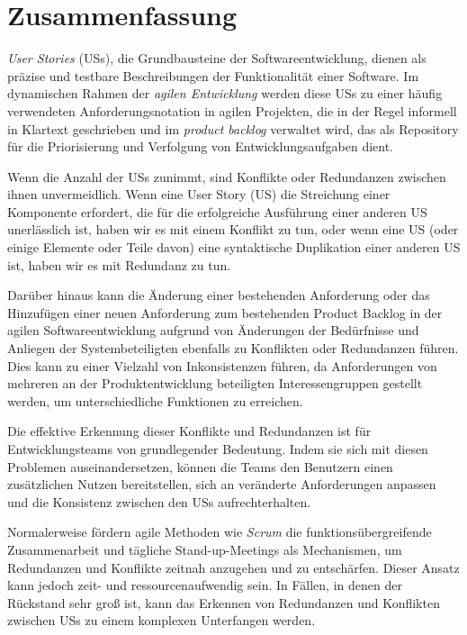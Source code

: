 \section*{Zusammenfassung}
\emph{User Stories} (USs), die Grundbausteine der Softwareentwicklung, dienen als präzise und testbare Beschreibungen der Funktionalität einer Software. Im dynamischen Rahmen der \emph{agilen Entwicklung} werden diese USs zu einer häufig verwendeten Anforderungsnotation in agilen Projekten\cite{wang2014role}, die in der Regel informell in Klartext geschrieben und im \textit{product backlog} verwaltet wird, das als Repository für die Priorisierung und Verfolgung von Entwicklungsaufgaben dient.

Wenn die Anzahl der USs zunimmt, sind Konflikte oder Redundanzen zwischen ihnen unvermeidlich. Wenn eine User Story (US) die Streichung einer Komponente erfordert, die für die erfolgreiche Ausführung einer anderen US unerlässlich ist, haben wir es mit einem Konflikt zu tun, oder wenn eine US (oder einige Elemente oder Teile davon) eine syntaktische Duplikation einer anderen US ist, haben wir es mit Redundanz zu tun.

Darüber hinaus kann die Änderung einer bestehenden Anforderung oder das Hinzufügen einer neuen Anforderung zum bestehenden Product Backlog in der agilen Softwareentwicklung aufgrund von Änderungen der Bedürfnisse und Anliegen der Systembeteiligten ebenfalls zu Konflikten oder Redundanzen führen. Dies kann zu einer Vielzahl von Inkonsistenzen führen, da Anforderungen von mehreren an der Produktentwicklung beteiligten Interessengruppen gestellt werden, um unterschiedliche Funktionen zu erreichen.

Die effektive Erkennung dieser Konflikte und Redundanzen ist für Entwicklungsteams von grundlegender Bedeutung. Indem sie sich mit diesen Problemen auseinandersetzen, können die Teams den Benutzern einen zusätzlichen Nutzen bereitstellen, sich an veränderte Anforderungen anpassen und die Konsistenz zwischen den USs aufrechterhalten. 

Normalerweise fördern agile Methoden wie \textit{Scrum} die funktionsübergreifende Zusammenarbeit und tägliche Stand-up-Meetings als Mechanismen, um Redundanzen und Konflikte zeitnah anzugehen und zu entschärfen. Dieser Ansatz kann jedoch zeit- und ressourcenaufwendig sein. In Fällen, in denen der Rückstand sehr groß ist, kann das Erkennen von Redundanzen und Konflikten zwischen USs zu einem komplexen Unterfangen werden.

